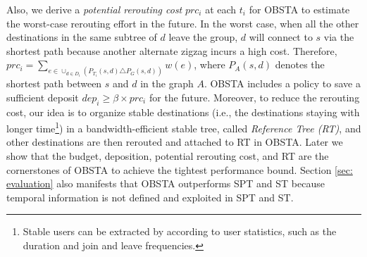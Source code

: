 \documentclass[10pt, conference, letterpaper]{IEEEtran}
\theoremstyle{definition}
\begin{document}
Also, we derive a \emph{potential rerouting cost} $prc_{i}$ at each $t_i$ for OBSTA to estimate the worst-case rerouting effort in the future. In the worst case, when all the other destinations in the same subtree of $d$ leave the group, $d$ will connect to $s$ via the shortest path because another alternate zigzag incurs a high cost. Therefore, $prc_{i}=\sum_{e\in \cup_{d\in D_i} (P_{T_{i}}(s,d)\triangle P_{G}(s,d))} w(e)$,
where $P_{A}(s,d)$ denotes the shortest path between $s$ and $d$ in the graph $A$.
OBSTA includes a policy to save a sufficient deposit $dep_{i}\geq \beta \times prc_{i}$ for the future. Moreover, to reduce the rerouting cost, our idea is to organize stable destinations (i.e., the destinations staying with longer time\footnote{Stable users can be extracted by \cite{StablePeer
} according to user statistics, such as the duration and join and leave frequencies.}) in a bandwidth-efficient stable tree, called \emph{Reference Tree (RT)}, and other destinations are then rerouted and attached to RT in OBSTA. Later we show that the budget, deposition, potential rerouting cost, and RT are the cornerstones of OBSTA to achieve the tightest performance bound. Section \ref{sec: evaluation} also manifests that OBSTA outperforms SPT and ST because temporal information is not defined and exploited in SPT and ST.



\end{document}
